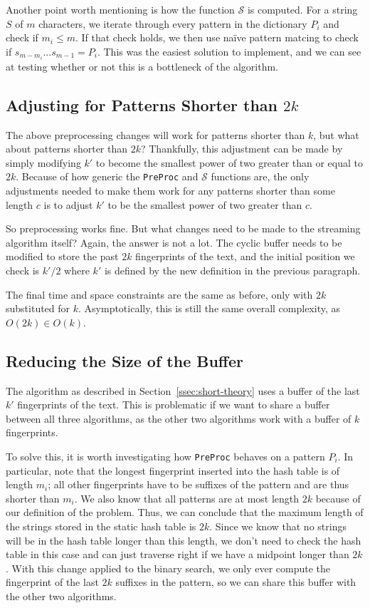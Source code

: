 \documentclass[ %
                    author={Dominic Joseph Moylett},
                    degree={MEng},
                     title={Dictionary Matching with Fingerprints},
                  subtitle={An Empirical Analysis},
                      type={research},
                      year={2015} ]{dissertation}
\begin{document}
Another point worth mentioning is how the function $\mathcal{S}$ is computed. For a string $S$ of $m$ characters, we iterate through every pattern in the dictionary $P_i$ and check if $m_i \leq m$. If that check holds, we then use na\"{i}ve pattern matcing to check if $s_{m - m_i}...s_{m - 1} = P_i$. This was the easiest solution to implement, and we can see at testing whether or not this is a bottleneck of the algorithm.

\subsection{Adjusting for Patterns Shorter than $2k$}

The above preprocessing changes will work for patterns shorter than $k$, but what about patterns shorter than $2k$? Thankfully, this adjustment can be made by simply modifying $k'$ to become the smallest power of two greater than or equal to $2k$. Because of how generic the \texttt{PreProc} and $\mathcal{S}$ functions are, the only adjustments needed to make them work for any patterns shorter than some length $c$ is to adjust $k'$ to be the smallest power of two greater than $c$.

So preprocessing works fine. But what changes need to be made to the streaming algorithm itself? Again, the answer is not a lot. The cyclic buffer needs to be modified to store the past $2k$ fingerprints of the text, and the initial position we check is $k'/2$ where $k'$ is defined by the new definition in the previous paragraph.

The final time and space constraints are the same as before, only with $2k$ substituted for $k$. Asymptotically, this is still the same overall complexity, as $O(2k) \in O(k)$.

\subsection{Reducing the Size of the Buffer}

The algorithm as described in Section~\ref{ssec:short-theory} uses a buffer of the last $k'$ fingerprints of the text. This is problematic if we want to share a buffer between all three algorithms, as the other two algorithms work with a buffer of $k$ fingerprints.

To solve this, it is worth investigating how \texttt{PreProc} behaves on a pattern $P_i$. In particular, note that the longest fingerprint inserted into the hash table is of length $m_i$; all other fingerprints have to be suffixes of the pattern and are thus shorter than $m_i$. We also know that all patterns are at most length $2k$ because of our definition of the problem. Thus, we can conclude that the maximum length of the strings stored in the static hash table is $2k$. Since we know that no strings will be in the hash table longer than this length, we don't need to check the hash table in this case and can just traverse right if we have a midpoint longer than $2k$. With this change applied to the binary search, we only ever compute the fingerprint of the last $2k$ suffixes in the pattern, so we can share this buffer with the other two algorithms.
\end{document}
